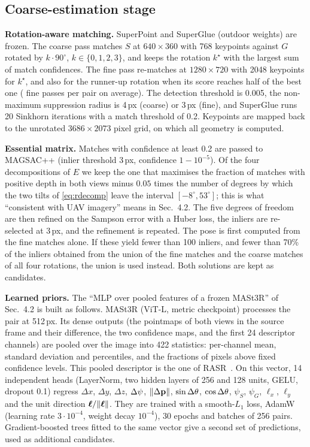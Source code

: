 \subsection{Coarse-estimation stage}
\label{sec:coarse}

\noindent\textbf{Rotation-aware matching.} SuperPoint and SuperGlue (outdoor weights) are frozen. The coarse pass matches $S$ at $640{\times}360$ with 768 keypoints against $G$ rotated by $k\cdot90^\circ$, $k\in\{0,1,2,3\}$, and keeps the rotation $k^\star$ with the largest sum of match confidences. The fine pass re-matches at $1280{\times}720$ with 2048 keypoints for $k^\star$, and also for the runner-up rotation when its score reaches half of the best one (\rtFine{} fine passes per pair on average). The detection threshold is 0.005, the non-maximum suppression radius is 4\,px (coarse) or 3\,px (fine), and SuperGlue runs 20 Sinkhorn iterations with a match threshold of 0.2. Keypoints are mapped back to the unrotated $3686{\times}2073$ pixel grid, on which all geometry is computed.

\noindent\textbf{Essential matrix.} Matches with confidence at least 0.2 are passed to MAGSAC++ (inlier threshold 3\,px, confidence $1{-}10^{-5}$). Of the four decompositions of $E$ we keep the one that maximises the fraction of matches with positive depth in both views minus $0.05$ times the number of degrees by which the two tilts of \cref{eq:rdecomp} leave the interval $[-8^\circ,53^\circ]$; this is what ``consistent with UAV imagery'' means in Sec.~4.2. The five degrees of freedom are then refined on the Sampson error with a Huber loss, the inliers are re-selected at 3\,px, and the refinement is repeated. The pose is first computed from the fine matches alone. If these yield fewer than 100 inliers, and fewer than 70\% of the inliers obtained from the union of the fine matches and the coarse matches of all four rotations, the union is used instead. Both solutions are kept as candidates.

\noindent\textbf{Learned priors.} The ``MLP over pooled features of a frozen MASt3R'' of Sec.~4.2 is built as follows. MASt3R (ViT-L, metric checkpoint) processes the pair at 512\,px. Its dense outputs (the pointmaps of both views in the source frame and their difference, the two confidence maps, and the first 24 descriptor channels) are pooled over the image into 422 statistics: per-channel mean, standard deviation and percentiles, and the fractions of pixels above fixed confidence levels. This pooled descriptor is the one of RASR~\cite{liang2026rasr}. On this vector, 14 independent heads (LayerNorm, two hidden layers of 256 and 128 units, GELU, dropout 0.1) regress $\Delta x$, $\Delta y$, $\Delta z$, $\Delta\psi$, $\|\Delta\mathbf{p}\|$, $\sin\Delta\theta$, $\cos\Delta\theta$, $\psi_S$, $\psi_G$, $\ell_x$, $\ell_y$ and the unit direction $\bm{\ell}/\|\bm{\ell}\|$. They are trained with a smooth-$L_1$ loss, AdamW (learning rate $3{\cdot}10^{-4}$, weight decay $10^{-4}$), 30 epochs and batches of 256 pairs. Gradient-boosted trees fitted to the same vector give a second set of predictions, used as additional candidates.

